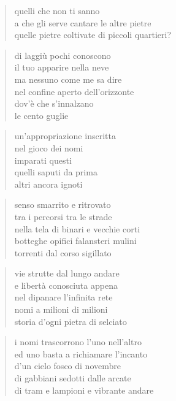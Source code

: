 \begin{verse}
    quelli che non ti sanno\\
    a che gli serve cantare le altre pietre\\
    quelle pietre coltivate di piccoli quartieri?
\end{verse}

\begin{verse}
    di laggiù pochi conoscono\\
    il tuo apparire nella neve\\
    ma nessuno come me sa dire\\
    nel confine aperto dell’orizzonte\\
    dov’è che s’innalzano\\
    le cento guglie
\end{verse}

\clearpage


\begin{verse}
    un'appropriazione inscritta\\
    nel gioco dei nomi\\
    imparati questi\\
    quelli saputi da prima\\
    altri ancora ignoti
\end{verse}

\begin{verse}
    senso smarrito e ritrovato\\
    tra i percorsi tra le strade\\
    nella tela di binari e vecchie corti\\
    botteghe opifici falansteri mulini\\
    torrenti dal corso sigillato
\end{verse}

\begin{verse}
    vie strutte dal lungo andare\\
    e libertà conosciuta appena\\
    nel dipanare l'infinita rete\\
    nomi a milioni di milioni\\
    storia d'ogni pietra di selciato
\end{verse}

\begin{verse}
    i nomi trascorrono l'uno nell'altro\\
    ed uno basta a richiamare l'incanto\\
    d'un cielo fosco di novembre\\
    di gabbiani sedotti dalle arcate\\
    di tram e lampioni e vibrante andare
\end{verse}

